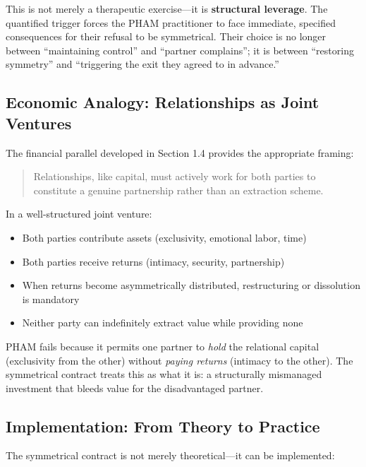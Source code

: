 \documentclass[12pt,openany]{book}
\numberwithin{equation}{chapter}
\begin{document}
This is not merely a therapeutic exercise---it is \textbf{structural leverage}. The quantified trigger forces the PHAM practitioner to face immediate, specified consequences for their refusal to be symmetrical. Their choice is no longer between ``maintaining control'' and ``partner complains''; it is between ``restoring symmetry'' and ``triggering the exit they agreed to in advance.''

\subsection{Economic Analogy: Relationships as Joint Ventures}

The financial parallel developed in Section 1.4 provides the appropriate framing:

\begin{quote}
Relationships, like capital, must actively work for both parties to constitute a genuine partnership rather than an extraction scheme.
\end{quote}

In a well-structured joint venture:
\begin{itemize}
    \item Both parties contribute assets (exclusivity, emotional labor, time)
    \item Both parties receive returns (intimacy, security, partnership)
    \item When returns become asymmetrically distributed, restructuring or dissolution is mandatory
    \item Neither party can indefinitely extract value while providing none
\end{itemize}

PHAM fails because it permits one partner to \textit{hold} the relational capital (exclusivity from the other) without \textit{paying returns} (intimacy to the other). The symmetrical contract treats this as what it is: a structurally mismanaged investment that bleeds value for the disadvantaged partner.

\subsection{Implementation: From Theory to Practice}

The symmetrical contract is not merely theoretical---it can be implemented:
\end{document}
